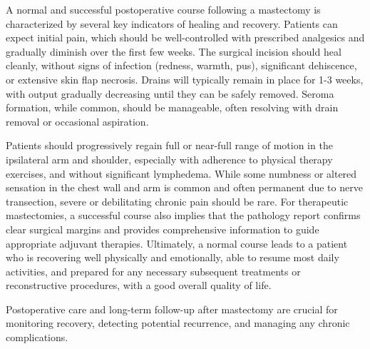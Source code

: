 A normal and successful postoperative course following a mastectomy is characterized by several key indicators of healing and recovery. Patients can expect initial pain, which should be well-controlled with prescribed analgesics and gradually diminish over the first few weeks. The surgical incision should heal cleanly, without signs of infection (redness, warmth, pus), significant dehiscence, or extensive skin flap necrosis. Drains will typically remain in place for 1-3 weeks, with output gradually decreasing until they can be safely removed. Seroma formation, while common, should be manageable, often resolving with drain removal or occasional aspiration.

Patients should progressively regain full or near-full range of motion in the ipsilateral arm and shoulder, especially with adherence to physical therapy exercises, and without significant lymphedema. While some numbness or altered sensation in the chest wall and arm is common and often permanent due to nerve transection, severe or debilitating chronic pain should be rare. For therapeutic mastectomies, a successful course also implies that the pathology report confirms clear surgical margins and provides comprehensive information to guide appropriate adjuvant therapies. Ultimately, a normal course leads to a patient who is recovering well physically and emotionally, able to resume most daily activities, and prepared for any necessary subsequent treatments or reconstructive procedures, with a good overall quality of life.

Postoperative care and long-term follow-up after mastectomy are crucial for monitoring recovery, detecting potential recurrence, and managing any chronic complications.

